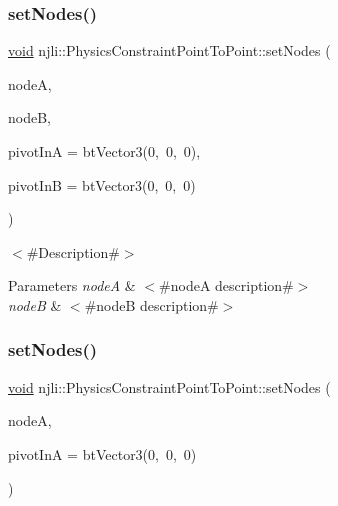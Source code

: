\subsubsection{\texorpdfstring{set\+Nodes()}{setNodes()}\hspace{0.1cm}{\footnotesize\ttfamily [1/2]}}
{\footnotesize\ttfamily \mbox{\hyperlink{_thread_8h_af1e856da2e658414cb2456cb6f7ebc66}{void}} njli\+::\+Physics\+Constraint\+Point\+To\+Point\+::set\+Nodes (\begin{DoxyParamCaption}\item[{\mbox{\hyperlink{classnjli_1_1_node}{Node}} $\ast$}]{nodeA,  }\item[{\mbox{\hyperlink{classnjli_1_1_node}{Node}} $\ast$}]{nodeB,  }\item[{const bt\+Vector3 \&}]{pivot\+InA = {\ttfamily btVector3(0,~0,~0)},  }\item[{const bt\+Vector3 \&}]{pivot\+InB = {\ttfamily btVector3(0,~0,~0)} }\end{DoxyParamCaption})}

$<$\#\+Description\#$>$


\begin{DoxyParams}{Parameters}
{\em nodeA} & $<$\#nodeA description\#$>$ \\
\hline
{\em nodeB} & $<$\#nodeB description\#$>$ \\
\hline
\end{DoxyParams}
\mbox{\label{classnjli_1_1_physics_constraint_point_to_point_acbf07690cbef3072ee6b5c141a4d21c5}} 
\subsubsection{\texorpdfstring{set\+Nodes()}{setNodes()}\hspace{0.1cm}{\footnotesize\ttfamily [2/2]}}
{\footnotesize\ttfamily \mbox{\hyperlink{_thread_8h_af1e856da2e658414cb2456cb6f7ebc66}{void}} njli\+::\+Physics\+Constraint\+Point\+To\+Point\+::set\+Nodes (\begin{DoxyParamCaption}\item[{\mbox{\hyperlink{classnjli_1_1_node}{Node}} $\ast$}]{nodeA,  }\item[{const bt\+Vector3 \&}]{pivot\+InA = {\ttfamily btVector3(0,~0,~0)} }\end{DoxyParamCaption})}


